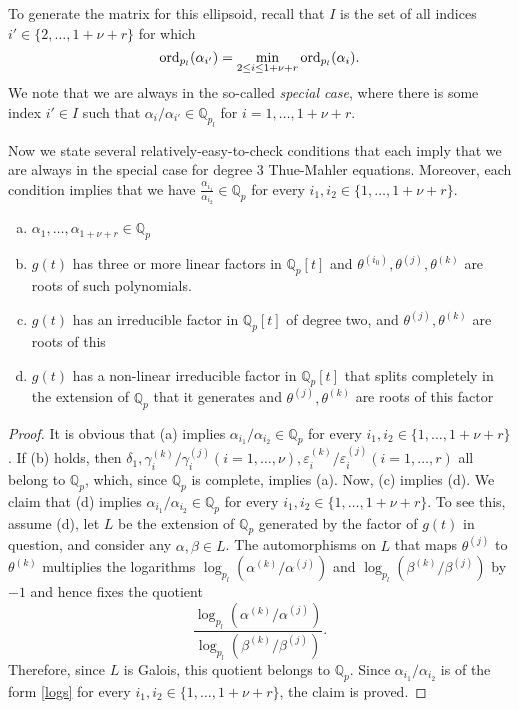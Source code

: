 To generate the matrix for this ellipsoid, recall that $I$ is the set of all indices $i' \in \{2, \dots, 1+ \nu + r\}$ for which
\[\operatorname{ord}_{p_l}(\alpha_{i'}) = \min_{2\leq i\leq 1+ \nu+ r} \operatorname{ord}_{p_l}(\alpha_i).\]
We note that we are always in the so-called \textit{special case}, where there is some index $i' \in I$ such that $\alpha_i/\alpha_{i'} \in \mathbb{Q}_{p_l}$ for $i = 1, \dots, 1+ \nu+ r$. 

Now we state several relatively-easy-to-check conditions that each imply that we are always in the special case for degree $3$ Thue-Mahler equations. Moreover, each condition implies that we have $\frac{\alpha_{i_1}}{\alpha_{i_2}} \in \mathbb{Q}_p$ for every $i_1, i_2 \in\{1, \dots, 1+\nu+r\}$.

\begin{enumerate}[(a)]
\item $\alpha_1, \dots, \alpha_{1+\nu+r} \in \mathbb{Q}_p$
\item $g(t)$ has three or more linear factors in $\mathbb{Q}_p[t]$ and $\theta^{(i_0)}, \theta^{(j)}, \theta^{(k)}$ are roots of such polynomials. 
\item $g(t)$ has an irreducible factor in $\mathbb{Q}_p[t]$ of degree two, and $\theta^{(j)}, \theta^{(k)}$ are roots of this
\item $g(t)$ has a non-linear irreducible factor in $\mathbb{Q}_p[t]$ that splits completely in the extension of $\mathbb{Q}_p$ that it generates and $\theta^{(j)}, \theta^{(k)}$ are roots of this factor
\end{enumerate}

\begin{proof}
It is obvious that (a) implies $\alpha_{i_1}/\alpha_{i_2} \in \mathbb{Q}_p$ for every $i_1, i_2 \in\{1, \dots, 1+\nu+r\}$. If (b) holds, then $\delta_1, \gamma_{i}^{(k)} / \gamma_{i}^{(j)} (i=1, \ldots, \nu), \varepsilon_{i}^{(k)} / \varepsilon_{i}^{(j)} (i=1, \ldots, r)$ all belong to $\mathbb{Q}_p$, which, since $\mathbb{Q}_p$ is complete, implies (a). Now, (c) implies (d). We claim that (d) implies $\alpha_{i_1}/\alpha_{i_2} \in \mathbb{Q}_p$ for every $i_1, i_2 \in\{1, \dots, 1+\nu+r\}$. To see this, assume (d), let $L$ be the extension of $\mathbb{Q}_p$ generated by the factor of $g(t)$ in question, and consider any $\alpha, \beta \in L$. The automorphisms on $L$ that maps $\theta^{(j)}$ to $\theta^{(k)}$ multiplies the logarithms $\log _{p_{l}}\left(\alpha^{(k)} / \alpha^{(j)}\right)$ and $\log _{p_{l}}\left(\beta^{(k)} / \beta^{(j)}\right)$ by $-1$ and hence fixes the quotient
\begin{equation}\label{logs}
\frac{\log _{p_{l}}\left(\alpha^{(k)} / \alpha^{(j)}\right)}{\log _{p_{l}}\left(\beta^{(k)} / \beta^{(j)}\right)}.
\end{equation}
Therefore, since $L$ is Galois, this quotient belongs to $\mathbb{Q}_p$. Since $\alpha_{i_1}/\alpha_{i_2}$ is of the form \eqref{logs} for every $i_1, i_2 \in\{1, \dots, 1+\nu+r\}$, the claim is proved. 
\end{proof}


